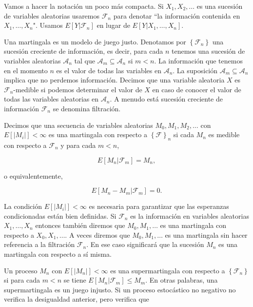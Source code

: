 Vamos a hacer la notación un poco más compacta. Si $X_1, X_2, \ldots$ es una sucesión de variables aleatorias usaremos $\mathcal{F}_n$ para denotar ``la información contenida en $X_1, \ldots, X_n$". Usamos $E[Y | \mathcal{F}_n]$ en lugar de $E[Y | X_1, \ldots, X_n]$.

Una martingala es un modelo de juego justo. Denotamos por $\left \{ \mathcal{F}_n \right \}$ una sucesión creciente de información, es decir, para cada $n$ tenemos una sucesión de variables aleatorias $\mathcal{A}_n$ tal que $\mathcal{A}_m \subseteq \mathcal{A}_n$ si $m<n$. La información que tenemos en el momento $n$ es el valor de todas las variables en $\mathcal{A}_n$. La suposición $\mathcal{A}_m \subseteq \mathcal{A}_n$ implica que no perdemos información. Decimos que una variable aleatoria $X$ es $\mathcal{F}_n$-medible si podemos determinar el valor de $X$ en caso de conocer el valor de todas las variables aleatorias en $\mathcal{A}_n$. A menudo está sucesión creciente de información $\mathcal{F}_n$ se denomina filtración.

Decimos que una secuencia de variables aleatorias $M_0, M_1, M_2, \ldots$ con $E[ |M_i|] < \infty$ es una martingala con respecto a $\left \{ \mathcal{F} \right \} _n$ si cada $M_n$ es medible con respecto a $\mathcal{F}_n$ y para cada $m<n$,

\begin{equation}\label{eq:martingala}
	E[M_n | \mathcal{F}_m] = M_n,
\end{equation}

o equivalentemente,

\begin{equation}
	E[M_n - M_m |\mathcal{F}_m] = 0.
\end{equation}	

La condición $E[|M_i|] < \infty$ es necesaria para garantizar que las esperanzas condicionadas están bien definidas. Si $\mathcal{F}_n$ es la información en variables aleatorias $X_1, \ldots, X_n$ entonces también diremos que $M_0, M_1, \ldots$ es una martingala con respecto a $X_0, X_1, \ldots$. A veces diremos que $M_0, M_1, \ldots$ es una martingala sin hacer referencia a la filtración $\mathcal{F}_n$. En ese caso significará que la sucesión $M_n$ es una martingala con respecto a sí misma. 

Un proceso $M_n$ con $E[|M_n|] < \infty$ es una supermartingala con respecto a $\left \{ \mathcal{F}_n \right \}$ si para cada $m<n$ se tiene $E[M_n | \mathcal{F}_m] \leq M_m$. En otras palabras, una supermartingala es un juego injusto. Si un proceso estocástico no negativo no verifica la desigualdad anterior, pero verifica que 

